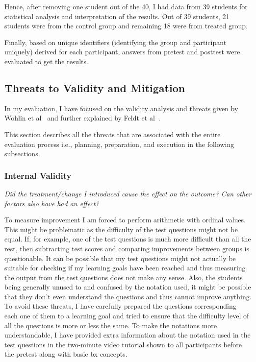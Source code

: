 Hence, after removing one student out of the 40, I had data from 39 students for statistical analysis and interpretation of the results. Out of 39 students, 21 students were from the control group and remaining 18 were from treated group.

Finally, based on unique identifiers (identifying the group and participant uniquely) derived for each participant, answers from pretest and posttest were evaluated to get the results. 

\subsection{Threats to Validity and Mitigation}\label{subsec:threats&mitigation}
In my evaluation, I have focused on the validity analysis and threats given by Wohlin et al~\cite{expinse} and further explained by Feldt et al~\cite{validitythreatsinse}. 

This section describes all the threats that are associated with the entire evaluation process i.e., planning, preparation, and execution in the following subsections.
 
\subsubsection{Internal Validity}\label{subsubsec:internalvalidity}
\emph{Did the treatment/change I introduced cause the effect on the outcome? Can other factors also have had an effect?}

\medskip
\noindent To measure improvement I am forced to perform arithmetic with ordinal values.
This might be problematic as the difficulty of the test questions might not be equal. If, for example, one of the test questions is much more difficult than all the rest, then subtracting test scores and comparing improvements between groups is questionable. It can be possible that my test questions might not actually be suitable for checking if my learning goals have been reached and thus measuring the output from the test questions does not make any sense. Also, the students being generally unused to and confused by the notation used, it might be possible that they don't even understand the questions and thus cannot improve anything. To avoid these threats, I have carefully prepared the questions corresponding each one of them to a learning goal and tried to ensure that the difficulty level of all the questions is more or less the same. To make the notations more understandable, I have provided extra information about the notation used in the test questions in the two-minute video tutorial shown to all participants before the pretest along with basic bx concepts.

